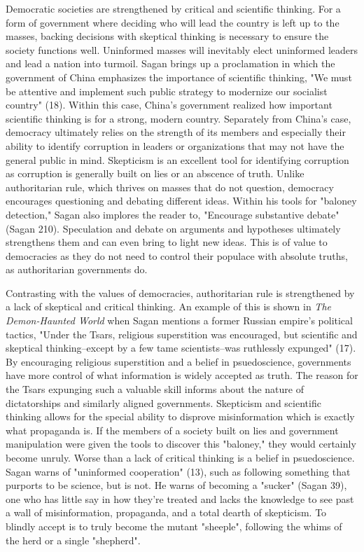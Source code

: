 \documentclass[12pt]{article}
\begin{document}
Democratic societies are strengthened by critical and scientific thinking. For a form of government where deciding who will lead the country is left up to
the masses, backing decisions with skeptical thinking is necessary to ensure the society functions well.
Uninformed masses will inevitably elect uninformed leaders and lead a nation into turmoil. Sagan brings up a proclamation in which the government of China 
emphasizes the importance of scientific thinking, "We must be attentive and implement such public strategy
to modernize our socialist country" (18). Within this case, China's government realized how important scientific thinking is for a strong, modern country.
Separately from China's case, democracy ultimately relies on the strength of its members and especially their ability to identify 
corruption in leaders or organizations that may not have
the general public in mind. Skepticism is an excellent tool for identifying corruption as corruption is generally built on lies or an abscence of truth.
Unlike authoritarian rule, which thrives on masses that do not question, democracy encourages questioning and debating different ideas.
Within his tools for "baloney detection," Sagan also implores the reader to, "Encourage substantive debate" (Sagan 210).
Speculation and debate on arguments and hypotheses ultimately strengthens them and can even bring to light new ideas. This is of value to democracies
as they do not need to control their populace with absolute truths, as authoritarian governments do.

Contrasting with the values of democracies, authoritarian rule is strengthened by a lack of skeptical and critical thinking.
An example of this is shown in \textit{The Demon-Haunted World} when Sagan mentions a former
Russian empire's political tactics, "Under the Tsars, religious superstition was encouraged, but scientific and skeptical thinking–except by a few
tame scientists–was ruthlessly expunged" (17). By encouraging religious superstition and a belief in psuedoscience, governments have more
control of what information is widely accepted as truth. The reason for the Tsars expunging such a valuable skill informs about the nature
of dictatorships and similarly aligned governments. Skepticism and scientific thinking allows for the special ability to disprove misinformation
which is exactly what propaganda is. If the members of a society built on lies and government manipulation were given the tools
to discover this "baloney," they would certainly become unruly. Worse than a lack of critical thinking is a belief in psuedoscience.
Sagan warns of "uninformed cooperation" (13), such as following something that purports to be science, but is not. He warns of 
becoming a "sucker" (Sagan 39), one who has little say in how they're treated and lacks the knowledge to see past a wall of
misinformation, propaganda, and a total dearth of skepticism. To blindly accept is to truly become the mutant "sheeple", following the 
whims of the herd or a single "shepherd".
\end{document}
